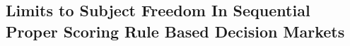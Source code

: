 











\subsection{Limits to Subject Freedom In Sequential Proper Scoring Rule Based Decision Markets}

